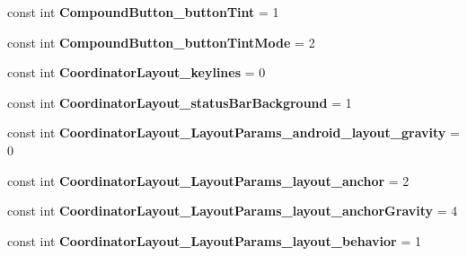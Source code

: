 \begin{DoxyCompactItemize}
\item 
\hypertarget{classClient_1_1Droid_1_1Resource_1_1Styleable_a261447c22bbf3fadd230c8e319800e6a}{}const int {\bfseries Compound\+Button\+\_\+button\+Tint} = 1\label{classClient_1_1Droid_1_1Resource_1_1Styleable_a261447c22bbf3fadd230c8e319800e6a}

\item 
\hypertarget{classClient_1_1Droid_1_1Resource_1_1Styleable_aeb87255604b519fed5cfc684bbce1448}{}const int {\bfseries Compound\+Button\+\_\+button\+Tint\+Mode} = 2\label{classClient_1_1Droid_1_1Resource_1_1Styleable_aeb87255604b519fed5cfc684bbce1448}

\item 
\hypertarget{classClient_1_1Droid_1_1Resource_1_1Styleable_ab174c0bab9e38558791ff9f9b1442748}{}const int {\bfseries Coordinator\+Layout\+\_\+keylines} = 0\label{classClient_1_1Droid_1_1Resource_1_1Styleable_ab174c0bab9e38558791ff9f9b1442748}

\item 
\hypertarget{classClient_1_1Droid_1_1Resource_1_1Styleable_a4df8893bbde4ffe5a4d074048dd1599b}{}const int {\bfseries Coordinator\+Layout\+\_\+status\+Bar\+Background} = 1\label{classClient_1_1Droid_1_1Resource_1_1Styleable_a4df8893bbde4ffe5a4d074048dd1599b}

\item 
\hypertarget{classClient_1_1Droid_1_1Resource_1_1Styleable_a07f308eae910bfeb3ddf2106f562f09b}{}const int {\bfseries Coordinator\+Layout\+\_\+\+Layout\+Params\+\_\+android\+\_\+layout\+\_\+gravity} = 0\label{classClient_1_1Droid_1_1Resource_1_1Styleable_a07f308eae910bfeb3ddf2106f562f09b}

\item 
\hypertarget{classClient_1_1Droid_1_1Resource_1_1Styleable_a349a95deaa6647408511928a8f4517d9}{}const int {\bfseries Coordinator\+Layout\+\_\+\+Layout\+Params\+\_\+layout\+\_\+anchor} = 2\label{classClient_1_1Droid_1_1Resource_1_1Styleable_a349a95deaa6647408511928a8f4517d9}

\item 
\hypertarget{classClient_1_1Droid_1_1Resource_1_1Styleable_a5a2a7a6cf6cae8e8690b478ddc0e1349}{}const int {\bfseries Coordinator\+Layout\+\_\+\+Layout\+Params\+\_\+layout\+\_\+anchor\+Gravity} = 4\label{classClient_1_1Droid_1_1Resource_1_1Styleable_a5a2a7a6cf6cae8e8690b478ddc0e1349}

\item 
\hypertarget{classClient_1_1Droid_1_1Resource_1_1Styleable_a5ee5ec31e469dd2d885e1234572f031f}{}const int {\bfseries Coordinator\+Layout\+\_\+\+Layout\+Params\+\_\+layout\+\_\+behavior} = 1\label{classClient_1_1Droid_1_1Resource_1_1Styleable_a5ee5ec31e469dd2d885e1234572f031f}


\end{DoxyCompactItemize}
